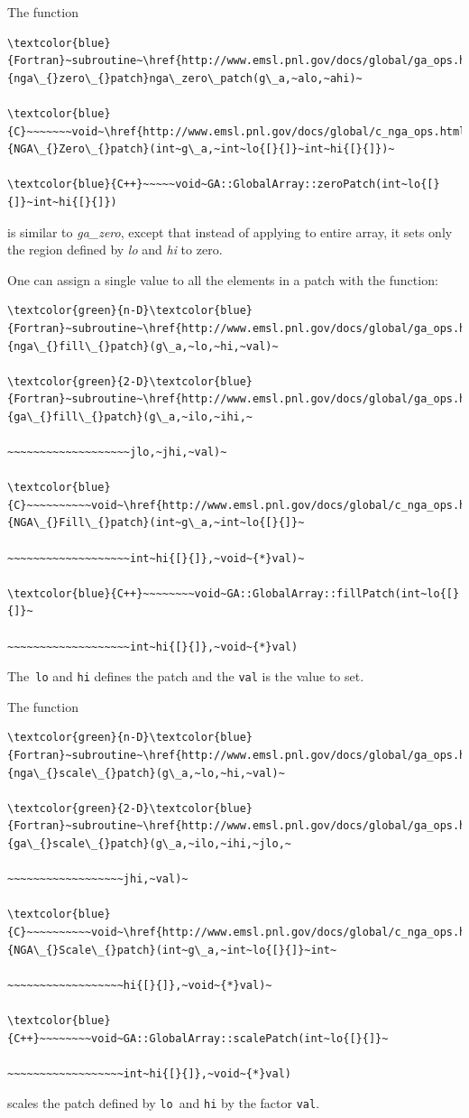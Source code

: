 The function
\begin{verbatim}
\textcolor{blue}{Fortran}~subroutine~\href{http://www.emsl.pnl.gov/docs/global/ga_ops.html\#ga_zero_patch}{nga\_{}zero\_{}patch}nga\_zero\_patch(g\_a,~alo,~ahi)~

\textcolor{blue}{C}~~~~~~~void~\href{http://www.emsl.pnl.gov/docs/global/c_nga_ops.html\#ga_zero_patch}{NGA\_{}Zero\_{}patch}(int~g\_a,~int~lo{[}{]}~int~hi{[}{]})~

\textcolor{blue}{C++}~~~~~void~GA::GlobalArray::zeroPatch(int~lo{[}{]}~int~hi{[}{]})
\end{verbatim}
is similar to \emph{ga\_zero}, except that instead of applying to
entire array, it sets only the region defined by \emph{lo} and \emph{hi}
to zero.

One can assign a single value to all the elements in a patch with
the function:
\begin{verbatim}
\textcolor{green}{n-D}\textcolor{blue}{Fortran}~subroutine~\href{http://www.emsl.pnl.gov/docs/global/ga_ops.html\#ga_fill_patch}{nga\_{}fill\_{}patch}(g\_a,~lo,~hi,~val)~

\textcolor{green}{2-D}\textcolor{blue}{Fortran}~subroutine~\href{http://www.emsl.pnl.gov/docs/global/ga_ops.html\#ga_fill_patch}{ga\_{}fill\_{}patch}(g\_a,~ilo,~ihi,~

~~~~~~~~~~~~~~~~~~~jlo,~jhi,~val)~

\textcolor{blue}{C}~~~~~~~~~~void~\href{http://www.emsl.pnl.gov/docs/global/c_nga_ops.html\#ga_fill_patch}{NGA\_{}Fill\_{}patch}(int~g\_a,~int~lo{[}{]}~

~~~~~~~~~~~~~~~~~~~int~hi{[}{]},~void~{*}val)~

\textcolor{blue}{C++}~~~~~~~~void~GA::GlobalArray::fillPatch(int~lo{[}{]}~

~~~~~~~~~~~~~~~~~~~int~hi{[}{]},~void~{*}val)
\end{verbatim}
The\texttt{ lo} and \texttt{hi} defines the patch and the \texttt{val}
is the value to set.

The function
\begin{verbatim}
\textcolor{green}{n-D}\textcolor{blue}{Fortran}~subroutine~\href{http://www.emsl.pnl.gov/docs/global/ga_ops.html\#ga_scale_patch}{nga\_{}scale\_{}patch}(g\_a,~lo,~hi,~val)~

\textcolor{green}{2-D}\textcolor{blue}{Fortran}~subroutine~\href{http://www.emsl.pnl.gov/docs/global/ga_ops.html\#ga_scale_patch}{ga\_{}scale\_{}patch}(g\_a,~ilo,~ihi,~jlo,~

~~~~~~~~~~~~~~~~~~jhi,~val)~

\textcolor{blue}{C}~~~~~~~~~~void~\href{http://www.emsl.pnl.gov/docs/global/c_nga_ops.html\#ga_scale_patch}{NGA\_{}Scale\_{}patch}(int~g\_a,~int~lo{[}{]}~int~

~~~~~~~~~~~~~~~~~~hi{[}{]},~void~{*}val)~

\textcolor{blue}{C++}~~~~~~~~void~GA::GlobalArray::scalePatch(int~lo{[}{]}~

~~~~~~~~~~~~~~~~~~int~hi{[}{]},~void~{*}val)
\end{verbatim}
scales the patch defined by \texttt{lo }and \texttt{hi} by the factor
\texttt{val}.

